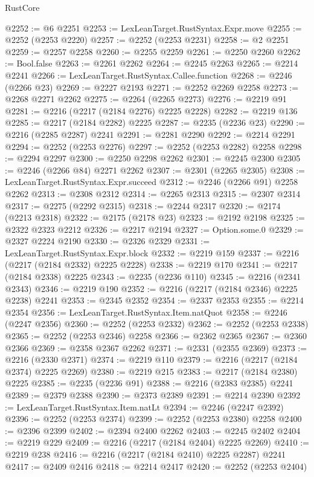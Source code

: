 \begin{lexlean}{RustCore}
\begin{coremodule}
@2252 := @6 @2251
@2253 := LexLeanTarget.RustSyntax.Expr.move
@2255 := @2252 (@2253 @2220)
@2257 := @2252 (@2253 @2231)
@2258 := @2 @2251
@2259 := @2257 @2258
@2260 := @2255 @2259
@2261 := @2250 @2260
@2262 := Bool.false
@2263 := @2261 @2262
@2264 := @2245 @2263
@2265 := @2214 @2241
@2266 := LexLeanTarget.RustSyntax.Callee.function
@2268 := @2246 (@2266 @23)
@2269 := @2227 @2193
@2271 := @2252 @2269 @2258
@2273 := @2268 @2271 @2262
@2275 := @2264 (@2265 @2273)
@2276 := @2219 @91
@2281 := @2216 (@2217 (@2184 @2276) @2225 @2228)
@2282 := @2219 @136
@2285 := @2217 (@2184 @2282) @2225
@2287 := @2235 (@2236 @23)
@2290 := @2216 (@2285 @2287) @2241
@2291 := @2281 @2290
@2292 := @2214 @2291
@2294 := @2252 (@2253 @2276)
@2297 := @2252 (@2253 @2282) @2258
@2298 := @2294 @2297
@2300 := @2250 @2298 @2262
@2301 := @2245 @2300
@2305 := @2246 (@2266 @84) @2271 @2262
@2307 := @2301 (@2265 @2305)
@2308 := LexLeanTarget.RustSyntax.Expr.succeed
@2312 := @2246 (@2266 @91) @2258 @2262
@2313 := @2308 @2312
@2314 := @2265 @2313
@2315 := @2307 @2314
@2317 := @2275 (@2292 @2315)
@2318 := @2244 @2317
@2320 := @2174 (@2213 @2318)
@2322 := @2175 (@2178 @23)
@2323 := @2192 @2198
@2325 := @2322 @2323 @2212
@2326 := @2217 @2194
@2327 := Option.some.{0}
@2329 := @2327 @2224 @2190
@2330 := @2326 @2329
@2331 := LexLeanTarget.RustSyntax.Expr.block
@2332 := @2219 @159
@2337 := @2216 (@2217 (@2184 @2332) @2225 @2228)
@2338 := @2219 @170
@2341 := @2217 (@2184 @2338) @2225
@2343 := @2235 (@2236 @110)
@2345 := @2216 (@2341 @2343)
@2346 := @2219 @190
@2352 := @2216 (@2217 (@2184 @2346) @2225 @2238) @2241
@2353 := @2345 @2352
@2354 := @2337 @2353
@2355 := @2214 @2354
@2356 := LexLeanTarget.RustSyntax.Item.natQuot
@2358 := @2246 (@2247 @2356)
@2360 := @2252 (@2253 @2332)
@2362 := @2252 (@2253 @2338)
@2365 := @2252 (@2253 @2346) @2258
@2366 := @2362 @2365
@2367 := @2360 @2366
@2369 := @2358 @2367 @2262
@2371 := @2331 (@2355 @2369)
@2373 := @2216 (@2330 @2371)
@2374 := @2219 @110
@2379 := @2216 (@2217 (@2184 @2374) @2225 @2269)
@2380 := @2219 @215
@2383 := @2217 (@2184 @2380) @2225
@2385 := @2235 (@2236 @91)
@2388 := @2216 (@2383 @2385) @2241
@2389 := @2379 @2388
@2390 := @2373 @2389
@2391 := @2214 @2390
@2392 := LexLeanTarget.RustSyntax.Item.natLt
@2394 := @2246 (@2247 @2392)
@2396 := @2252 (@2253 @2374)
@2399 := @2252 (@2253 @2380) @2258
@2400 := @2396 @2399
@2402 := @2394 @2400 @2262
@2403 := @2245 @2402
@2404 := @2219 @229
@2409 := @2216 (@2217 (@2184 @2404) @2225 @2269)
@2410 := @2219 @238
@2416 := @2216 (@2217 (@2184 @2410) @2225 @2287) @2241
@2417 := @2409 @2416
@2418 := @2214 @2417
@2420 := @2252 (@2253 @2404)

\end{coremodule}
\end{lexlean}
